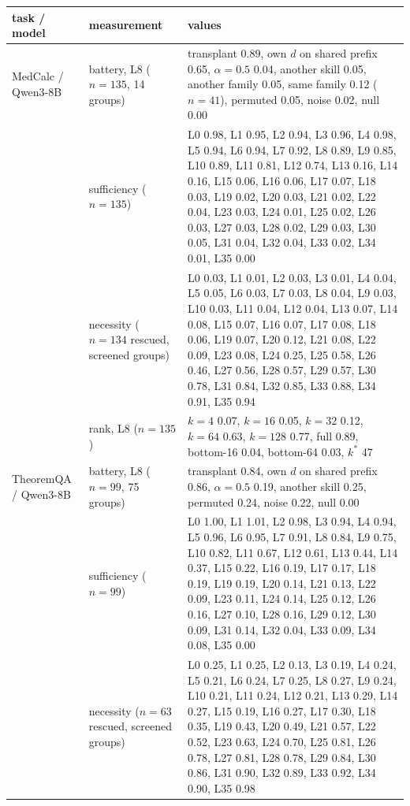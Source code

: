 \begin{tabular}{@{}p{}p{}p{}@{}}
\toprule
task / model & measurement & values \\
\midrule
MedCalc / Qwen3-8B & battery, L8 ($n=135$, 14 groups) & transplant 0.89, own $d$ on shared prefix 0.65, $\alpha{=}0.5$ 0.04, another skill 0.05, another family 0.05, same family 0.12 ($n=41$), permuted 0.05, noise 0.02, null 0.00 \\
 & sufficiency ($n=135$) & L0 0.98, L1 0.95, L2 0.94, L3 0.96, L4 0.98, L5 0.94, L6 0.94, L7 0.92, L8 0.89, L9 0.85, L10 0.89, L11 0.81, L12 0.74, L13 0.16, L14 0.16, L15 0.06, L16 0.06, L17 0.07, L18 0.03, L19 0.02, L20 0.03, L21 0.02, L22 0.04, L23 0.03, L24 0.01, L25 0.02, L26 0.03, L27 0.03, L28 0.02, L29 0.03, L30 0.05, L31 0.04, L32 0.04, L33 0.02, L34 0.01, L35 0.00 \\
 & necessity ($n=134$ rescued, screened groups) & L0 0.03, L1 0.01, L2 0.03, L3 0.01, L4 0.04, L5 0.05, L6 0.03, L7 0.03, L8 0.04, L9 0.03, L10 0.03, L11 0.04, L12 0.04, L13 0.07, L14 0.08, L15 0.07, L16 0.07, L17 0.08, L18 0.06, L19 0.07, L20 0.12, L21 0.08, L22 0.09, L23 0.08, L24 0.25, L25 0.58, L26 0.46, L27 0.56, L28 0.57, L29 0.57, L30 0.78, L31 0.84, L32 0.85, L33 0.88, L34 0.91, L35 0.94 \\
 & rank, L8 ($n=135$) & $k{=}4$ 0.07, $k{=}16$ 0.05, $k{=}32$ 0.12, $k{=}64$ 0.63, $k{=}128$ 0.77, full 0.89, bottom-16 0.04, bottom-64 0.03, $k^{*}$ 47 \\
\midrule
TheoremQA / Qwen3-8B & battery, L8 ($n=99$, 75 groups) & transplant 0.84, own $d$ on shared prefix 0.86, $\alpha{=}0.5$ 0.19, another skill 0.25, permuted 0.24, noise 0.22, null 0.00 \\
 & sufficiency ($n=99$) & L0 1.00, L1 1.01, L2 0.98, L3 0.94, L4 0.94, L5 0.96, L6 0.95, L7 0.91, L8 0.84, L9 0.75, L10 0.82, L11 0.67, L12 0.61, L13 0.44, L14 0.37, L15 0.22, L16 0.19, L17 0.17, L18 0.19, L19 0.19, L20 0.14, L21 0.13, L22 0.09, L23 0.11, L24 0.14, L25 0.12, L26 0.16, L27 0.10, L28 0.16, L29 0.12, L30 0.09, L31 0.14, L32 0.04, L33 0.09, L34 0.08, L35 0.00 \\
 & necessity ($n=63$ rescued, screened groups) & L0 0.25, L1 0.25, L2 0.13, L3 0.19, L4 0.24, L5 0.21, L6 0.24, L7 0.25, L8 0.27, L9 0.24, L10 0.21, L11 0.24, L12 0.21, L13 0.29, L14 0.27, L15 0.19, L16 0.27, L17 0.30, L18 0.35, L19 0.43, L20 0.49, L21 0.57, L22 0.52, L23 0.63, L24 0.70, L25 0.81, L26 0.78, L27 0.81, L28 0.78, L29 0.84, L30 0.86, L31 0.90, L32 0.89, L33 0.92, L34 0.90, L35 0.98 \\

\end{tabular}
